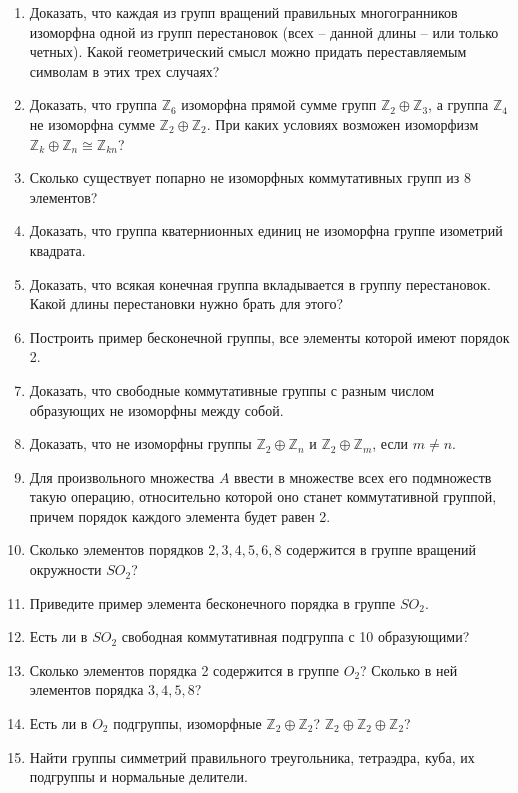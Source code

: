 \begin{enumerate}
		\item Доказать, что каждая из групп вращений правильных многогранников изоморфна одной из групп перестановок (всех -- данной длины -- или только четных). Какой геометрический смысл можно придать переставляемым символам в этих трех случаях?

		\item Доказать, что группа $\mathbb{Z}_{6}$ изоморфна прямой сумме групп $\mathbb{Z}_2 \oplus \mathbb{Z}_3$, а группа $\mathbb{Z}_{4}$ не изоморфна сумме $\mathbb{Z}_2 \oplus \mathbb{Z}_2$. 
		При каких условиях возможен изоморфизм $\mathbb{Z}_k \oplus \mathbb{Z}_n \cong \mathbb{Z}_{kn}$?

		\item Сколько существует попарно не изоморфных коммутативных групп из 8 элементов?

		\item Доказать, что группа кватернионных единиц не изоморфна группе изометрий квадрата.

		\item Доказать, что всякая конечная группа вкладывается в группу перестановок. Какой длины перестановки нужно брать для этого?

		\item Построить пример бесконечной группы, все элементы которой имеют порядок 2.

		\item Доказать, что свободные коммутативные группы с разным числом образующих не изоморфны между собой.

		\item Доказать, что не изоморфны группы $\mathbb{Z}_2 \oplus \mathbb{Z}_n$ и $\mathbb{Z}_2 \oplus \mathbb{Z}_m$, если $m \ne n$.

		\item Для произвольного множества $A$ ввести в множестве всех его подмножеств такую операцию, относительно которой оно станет коммутативной группой, причем порядок каждого элемента будет равен 2.

		\item Сколько элементов порядков $2, 3, 4, 5, 6, 8$ содержится в группе вращений окружности $SO_2$?

		\item Приведите пример элемента бесконечного порядка в группе $SO_2$.

		\item Есть ли в $SO_2$ свободная коммутативная подгруппа с 10 образующими?

		\item Сколько элементов порядка 2 содержится в группе $O_2$? Сколько в ней элементов порядка $3, 4, 5, 8$?

		\item Есть ли в $O_2$ подгруппы, изоморфные $\mathbb{Z}_2 \oplus \mathbb{Z}_2$? $\mathbb{Z}_2 \oplus \mathbb{Z}_2 \oplus \mathbb{Z}_2$?

		\item Найти группы симметрий правильного треугольника, тетраэдра, куба, их подгруппы и нормальные делители.
	\end{enumerate}
